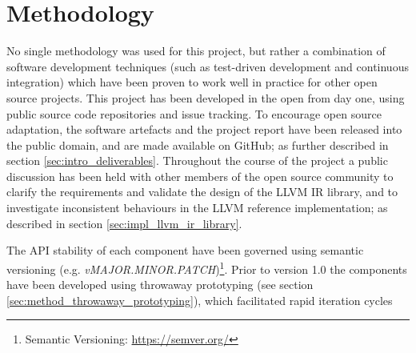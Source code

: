 

\section{Methodology}
\label{sec:methodology}


No single methodology was used for this project, but rather a combination of software development techniques (such as test-driven development and continuous integration) which have been proven to work well in practice for other open source projects. This project has been developed in the open from day one, using public source code repositories and issue tracking. To encourage open source adaptation, the software artefacts and the project report have been released into the public domain, and are made available on GitHub; as further described in section \ref{sec:intro_deliverables}. Throughout the course of the project a public discussion has been held with other members of the open source community to clarify the requirements and validate the design of the LLVM IR library, and to investigate inconsistent behaviours in the LLVM reference implementation; as described in section \ref{sec:impl_llvm_ir_library}.


The API stability of each component have been governed using semantic versioning (e.g. \textit{vMAJOR.MINOR.PATCH})\footnote{Semantic Versioning: \url{https://semver.org/}}. Prior to version 1.0 the components have been developed using throwaway prototyping (see section \ref{sec:method_throwaway_prototyping}), which facilitated rapid iteration cycles




